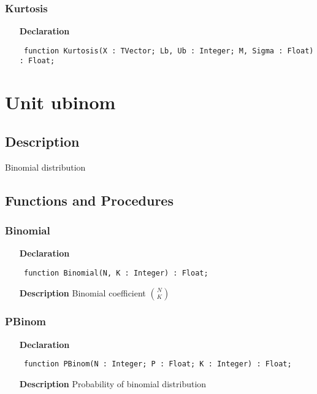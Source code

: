 \documentclass[12pt,a4paper,oneside]{report}
\newcommand{\declarationitem}[1]{\textbf{#1}}
\newcommand{\descriptiontitle}[1]{\textbf{#1}}
\newcommand{\code}[1]{\texttt{#1}}
\begin{document}
\subsubsection{Kurtosis}
\label{uskew-Kurtosis}
\begin{itemize}\item[\declarationitem{Declaration}\hfill]
	\begin{flushleft}
		\code{
			function Kurtosis(X : TVector; Lb, Ub : Integer; M, Sigma : Float) : Float;}
	\end{flushleft}
\end{itemize}
\section{Unit ubinom}
\label{ubinom}
\subsection{Description}
Binomial distribution 
\subsection{Functions and Procedures}
\subsubsection{Binomial}
\label{ubinom-Binomial}
\begin{itemize}\item[\declarationitem{Declaration}\hfill]
	\begin{flushleft}
		\code{
			function Binomial(N, K : Integer) : Float;}
	\end{flushleft}
	\item[\descriptiontitle{Description}]
	Binomial coefficient $\binom{N}{K}$
\end{itemize}
\subsubsection{PBinom}
\label{ubinom-PBinom}
\begin{itemize}\item[\declarationitem{Declaration}\hfill]
	\begin{flushleft}
		\code{
			function PBinom(N : Integer; P : Float; K : Integer) : Float;}
	\end{flushleft}
	\item[\descriptiontitle{Description}]
	Probability of binomial distribution
\end{itemize}
\end{document}
